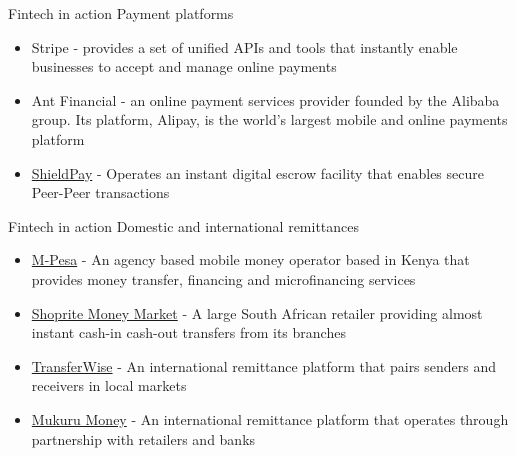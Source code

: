 \documentclass[11pt]{beamer}
\begin{document}
\begin{frame}{Fintech in action}
	Payment platforms
	\begin{itemize}
		\item Stripe - provides a set of unified APIs and tools that instantly enable businesses to accept and manage online payments
		\item Ant Financial - an online payment services provider founded by the Alibaba group. Its platform, Alipay, is the world's largest mobile and online payments platform
		\item \href{https://www.shieldpay.com/}{ShieldPay} - Operates an instant digital escrow facility that enables secure Peer-Peer transactions
	\end{itemize}
\end{frame}


\begin{frame}{Fintech in action}
	Domestic and international remittances
	\begin{itemize}
		\item \href{https://www.safaricom.co.ke/personal/m-pesa}{M-Pesa} - An agency based mobile money operator based in Kenya that provides money transfer, financing and microfinancing services
		\item \href{https://www.shoprite.co.za/money-market/money-transfers.html}{Shoprite Money Market} - A large South African retailer providing almost instant cash-in cash-out transfers from its branches
		\item \href{https://transferwise.com/}{TransferWise} - An international remittance platform that pairs senders and receivers in local markets
		\item \href{http://sa.mukuru.com}{Mukuru Money} - An international remittance platform that operates through partnership with retailers and banks
	\end{itemize}
\end{frame}

\end{document}
